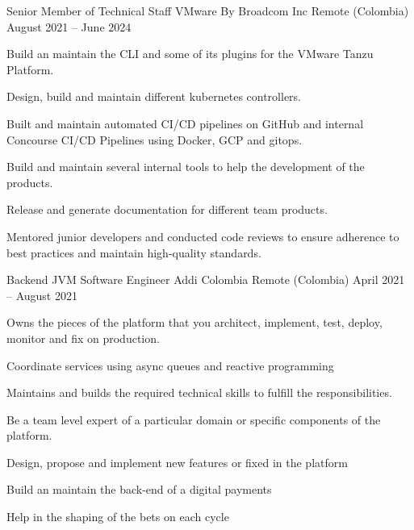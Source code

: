 

\begin{cventries}

  \cventry
    {Senior Member of Technical Staff} %
    {VMware By Broadcom Inc} %
    {Remote (Colombia)} %
    {August 2021 – June 2024 } %
    {
      \begin{cvitems} %
        \item {Build an maintain the CLI and some of its plugins for the VMware Tanzu Platform.}
        \item {Design, build and maintain different kubernetes controllers.}
        \item {Built and maintain automated CI/CD pipelines on GitHub and internal Concourse CI/CD Pipelines using Docker, GCP and gitops.}
        \item {Build and maintain several internal tools to help the development of the products.}
        \item {Release and generate documentation for different team products.}
        \item {Mentored junior developers and conducted code reviews to ensure adherence to best practices and maintain high‐quality standards.}
      \end{cvitems}
    }

  \cventry
    {Backend JVM Software Engineer} %
    {Addi Colombia} %
    {Remote (Colombia)} %
    {April 2021 – August 2021} %
    {
      \begin{cvitems} %
        \item {Owns the pieces of the platform that you architect, implement, test, deploy, monitor and fix on production.}
        \item {Coordinate services using async queues and reactive programming}
        \item {Maintains and builds the required technical skills to fulfill the responsibilities.}
        \item {Be a team level expert of a particular domain or specific components of the platform.}
        \item {Design, propose and implement new features or fixed in the platform}
        \item {Build an maintain the back-end of a digital payments}
        \item {Help in the shaping of the bets on each cycle}
      \end{cvitems}
    }


\end{cventries}

